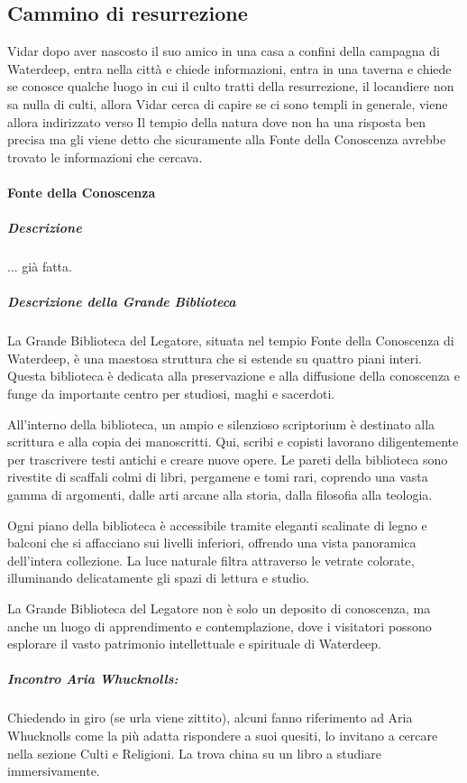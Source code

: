 \documentclass{article}
\begin{document}
\newpage

\subsection{Cammino di resurrezione}
Vidar dopo aver nascosto il suo amico in una casa a confini della campagna di Waterdeep, entra nella città e chiede informazioni, entra in una taverna e chiede se conosce qualche luogo in cui il culto tratti della resurrezione, il locandiere non sa nulla di culti, allora Vidar cerca di capire se ci sono templi in generale, viene allora indirizzato verso Il tempio della natura dove non ha una risposta ben precisa ma gli viene detto che sicuramente alla Fonte della Conoscenza avrebbe trovato le informazioni che cercava. 
\paragraph{Fonte della Conoscenza}
    \subparagraph{Descrizione} ... già fatta.

  
    \subparagraph{Descrizione della Grande Biblioteca}
    La Grande Biblioteca del Legatore, situata nel tempio Fonte della Conoscenza di Waterdeep, è una maestosa struttura che si estende su quattro piani interi. Questa biblioteca è dedicata alla preservazione e alla diffusione della conoscenza e funge da importante centro per studiosi, maghi e sacerdoti.
    
    All'interno della biblioteca, un ampio e silenzioso scriptorium è destinato alla scrittura e alla copia dei manoscritti. Qui, scribi e copisti lavorano diligentemente per trascrivere testi antichi e creare nuove opere. Le pareti della biblioteca sono rivestite di scaffali colmi di libri, pergamene e tomi rari, coprendo una vasta gamma di argomenti, dalle arti arcane alla storia, dalla filosofia alla teologia.
    
    Ogni piano della biblioteca è accessibile tramite eleganti scalinate di legno e balconi che si affacciano sui livelli inferiori, offrendo una vista panoramica dell'intera collezione. La luce naturale filtra attraverso le vetrate colorate, illuminando delicatamente gli spazi di lettura e studio.
    
    La Grande Biblioteca del Legatore non è solo un deposito di conoscenza, ma anche un luogo di apprendimento e contemplazione, dove i visitatori possono esplorare il vasto patrimonio intellettuale e spirituale di Waterdeep.
    
    \subparagraph{Incontro Aria Whucknolls:} 
        Chiedendo in giro (se urla viene zittito), alcuni fanno riferimento ad Aria Whucknolls come la più adatta rispondere a suoi quesiti, lo invitano a cercare nella sezione Culti e Religioni. La trova china su un libro a studiare immersivamente. 
\end{document}
